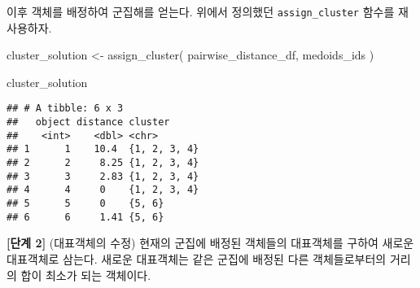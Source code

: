 \documentclass[
]{book}
\newenvironment{Shaded}{\begin{snugshade}}{\end{snugshade}}
\newcommand{\AttributeTok}[1]{\textcolor[rgb]{0.77,0.63,0.00}{#1}}
\newcommand{\ControlFlowTok}[1]{\textcolor[rgb]{0.13,0.29,0.53}{\textbf{#1}}}
\newcommand{\DecValTok}[1]{\textcolor[rgb]{0.00,0.00,0.81}{#1}}
\newcommand{\FunctionTok}[1]{\textcolor[rgb]{0.00,0.00,0.00}{#1}}
\newcommand{\NormalTok}[1]{#1}
\newcommand{\OtherTok}[1]{\textcolor[rgb]{0.56,0.35,0.01}{#1}}
\newcommand{\SpecialCharTok}[1]{\textcolor[rgb]{0.00,0.00,0.00}{#1}}
\begin{document}
이후 객체를 배정하여 군집해를 얻는다. 위에서 정의했던 \texttt{assign\_cluster} 함수를 재사용하자.

\begin{Shaded}
\begin{Highlighting}[]
\NormalTok{cluster\_solution }\OtherTok{\textless{}{-}} \FunctionTok{assign\_cluster}\NormalTok{(}
\NormalTok{  pairwise\_distance\_df, }
\NormalTok{  medoids\_ids}
\NormalTok{  )}

\NormalTok{cluster\_solution}
\end{Highlighting}
\end{Shaded}

\begin{verbatim}
## # A tibble: 6 x 3
##   object distance cluster     
##    <int>    <dbl> <chr>       
## 1      1    10.4  {1, 2, 3, 4}
## 2      2     8.25 {1, 2, 3, 4}
## 3      3     2.83 {1, 2, 3, 4}
## 4      4     0    {1, 2, 3, 4}
## 5      5     0    {5, 6}      
## 6      6     1.41 {5, 6}
\end{verbatim}

\textbf{{[}단계 2{]}} (대표객체의 수정) 현재의 군집에 배정된 객체들의 대표객체를 구하여 새로운 대표객체로 삼는다. 새로운 대표객체는 같은 군집에 배정된 다른 객체들로부터의 거리의 합이 최소가 되는 객체이다.

\begin{Shaded}
\end{Shaded}
\end{document}
